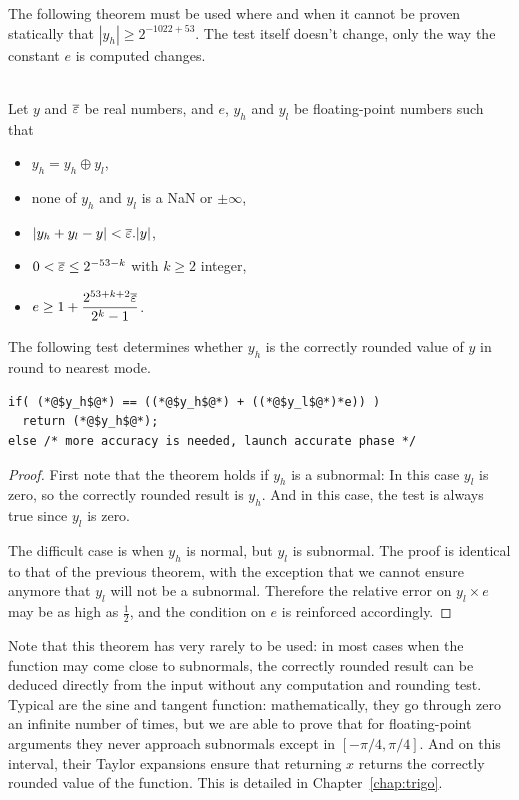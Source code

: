 The following theorem must be used where and when it cannot be proven
statically that $|y_h|\ge 2^{-1022+53}$. The test itself doesn't
change, only the way the constant $e$ is computed changes. 

\begin{theorem}
\label{th:roundingRN2}
~\\
  Let $y$ and ${\overline{\varepsilon}}$ be real numbers, and $e$, $y_h$ and $y_l$ be
  floating-point numbers such that 
  \begin{itemize}
  \item $y_h=y_h\oplus y_l$,
  \item none of $y_h$ and $y_l$ is a  NaN  or $\pm \infty$,
  \item $|y_h+y_l - y| <{\overline{\varepsilon}}.|y|$,
  \item $0<{\overline{\varepsilon}} \le 2^{-53-k}$ with $k\ge 2$ integer,
  \item $e\ge 1+  \dfrac{2^{53+k+2}{\overline{\varepsilon}}}{2^{k}-1}$.
\end{itemize}

The following test determines whether $y_h$ is the
  correctly rounded value of $y$ in  round to nearest mode.

\begin{lstlisting}[firstnumber=1]
if( (*@$y_h$@*) == ((*@$y_h$@*) + ((*@$y_l$@*)*e)) )
  return (*@$y_h$@*);
else /* more accuracy is needed, launch accurate phase */
\end{lstlisting}
\end{theorem}

\begin{proof}
  First note that the theorem holds if $y_h$ is a subnormal: In this
  case $y_l$ is zero, so the correctly rounded result is $y_h$. And in
  this case, the test is always true since $y_l$ is zero.

  The difficult case is when $y_h$ is normal, but $y_l$ is subnormal.
  The proof is identical to that of the previous theorem, with the
  exception that we cannot ensure anymore that $y_l$ will not be a
  subnormal.  Therefore the relative error on $y_l\times e$ may be as
  high as $\frac{1}{2}$, and the condition on $e$ is reinforced
  accordingly. 
\end{proof}

Note that this theorem has very rarely to be used: in most cases when
the function may come close to subnormals, the correctly rounded
result can be deduced directly from the input without any computation
and rounding test. Typical are the sine and tangent function:
mathematically, they go through zero an infinite number of times, but
we are able to prove that for floating-point arguments they never
approach subnormals except in $[-\pi/4, \pi/4]$. And on this interval,
their Taylor expansions ensure that returning $x$ returns the
correctly rounded value of the function. This is detailed in
Chapter~\ref{chap:trigo}.

